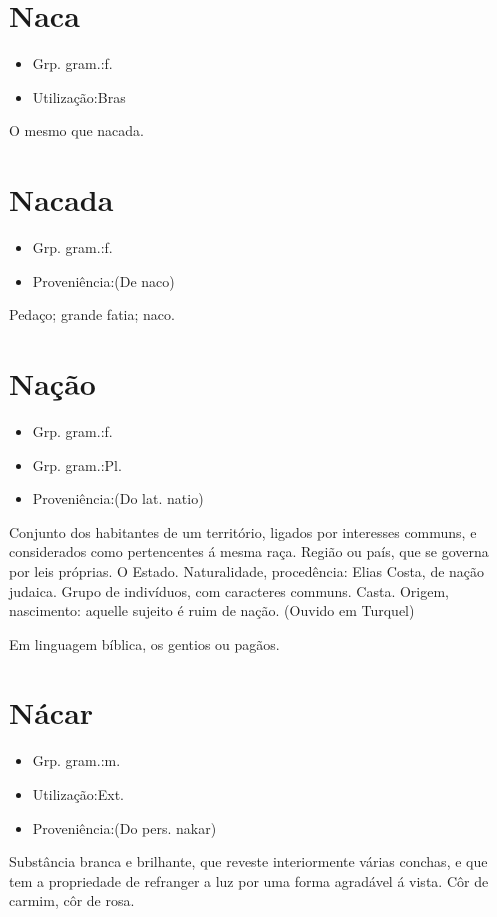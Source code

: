 \section{Naca}
\begin{itemize}
\item {Grp. gram.:f.}
\end{itemize}
\begin{itemize}
\item {Utilização:Bras}
\end{itemize}
O mesmo que \textunderscore nacada\textunderscore .
\section{Nacada}
\begin{itemize}
\item {Grp. gram.:f.}
\end{itemize}
\begin{itemize}
\item {Proveniência:(De \textunderscore naco\textunderscore )}
\end{itemize}
Pedaço; grande fatia; naco.
\section{Nação}
\begin{itemize}
\item {Grp. gram.:f.}
\end{itemize}
\begin{itemize}
\item {Grp. gram.:Pl.}
\end{itemize}
\begin{itemize}
\item {Proveniência:(Do lat. \textunderscore natio\textunderscore )}
\end{itemize}
Conjunto dos habitantes de um território, ligados por interesses communs, e considerados como pertencentes á mesma raça.
Região ou país, que se governa por leis próprias.
O Estado.
Naturalidade, procedência: \textunderscore Elias Costa, de nação judaica\textunderscore .
Grupo de indivíduos, com caracteres communs.
Casta.
Origem, nascimento: \textunderscore aquelle sujeito é ruim de nação\textunderscore . (Ouvido em Turquel)

Em linguagem bíblica, os gentios ou pagãos.
\section{Nácar}
\begin{itemize}
\item {Grp. gram.:m.}
\end{itemize}
\begin{itemize}
\item {Utilização:Ext.}
\end{itemize}
\begin{itemize}
\item {Proveniência:(Do pers. \textunderscore nakar\textunderscore )}
\end{itemize}
Substância branca e brilhante, que reveste interiormente várias conchas, e que tem a propriedade de refranger a luz por uma forma agradável á vista.
Côr de carmim, côr de rosa.
